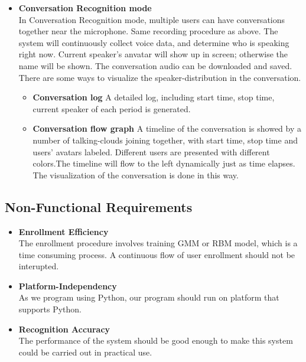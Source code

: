 \begin{itemize}
		\item \textbf{Conversation Recognition mode} \\
			In Conversation Recognition mode, multiple users can have conversations
			together near the microphone. Same recording procedure as above. 
			The system will continuously collect voice data, and determine
			who is speaking right now. Current speaker's anvatar will show up
			in screen; otherwise the name will be shown. The conversation
			audio can be downloaded and saved.
			There are some ways to visualize the speaker-distribution in the
			conversation.
			\begin{itemize}
				\item \textbf{Conversation log}
					A detailed log, including start time, stop time,
					current speaker of each period is generated.
				\item \textbf{Conversation flow graph}
					A timeline of the conversation is showed by a number of
					talking-clouds joining together, with start time, stop time
					and users' avatars labeled. Different users are presented
					with different colors.The timeline will flow to the left dynamically
					just as time elapses. The visualization of the conversation is done
					in this way.
			\end{itemize}

	\end{itemize}

\subsection{Non-Functional Requirements}
	\begin{itemize}
		\item \textbf{Enrollment Efficiency} \\
			The enrollment procedure involves training GMM or RBM model, which
			is a time consuming process. A continuous flow of user enrollment
			should not be interupted.
		\item \textbf{Platform-Independency} \\
			As we program using Python, our program should run on
			platform that supports Python.
		\item \textbf{Recognition Accuracy} \\
			The performance of the system should be good enough to
			make this system could be carried out in practical use.
	\end{itemize}
